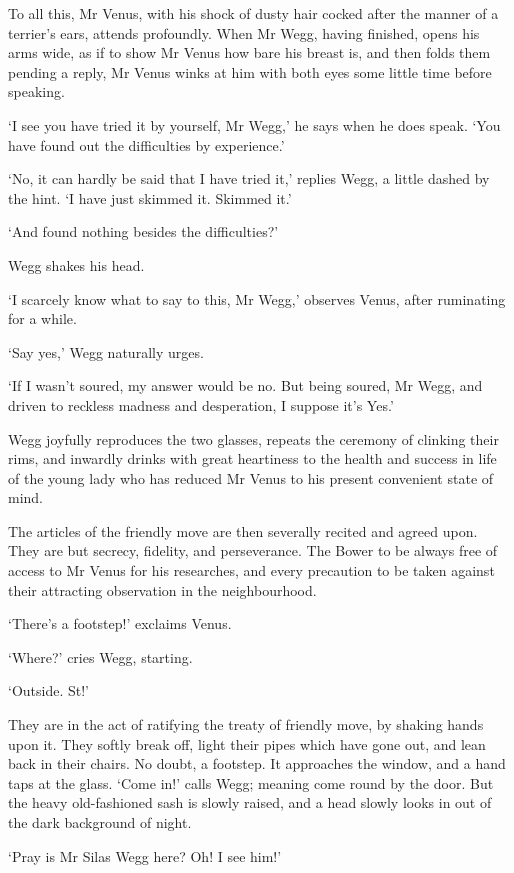 To all this, Mr Venus, with his shock of dusty hair cocked after the
manner of a terrier’s ears, attends profoundly. When Mr Wegg, having
finished, opens his arms wide, as if to show Mr Venus how bare his
breast is, and then folds them pending a reply, Mr Venus winks at him
with both eyes some little time before speaking.

‘I see you have tried it by yourself, Mr Wegg,’ he says when he does
speak. ‘You have found out the difficulties by experience.’

‘No, it can hardly be said that I have tried it,’ replies Wegg, a little
dashed by the hint. ‘I have just skimmed it. Skimmed it.’

‘And found nothing besides the difficulties?’

Wegg shakes his head.

‘I scarcely know what to say to this, Mr Wegg,’ observes Venus, after
ruminating for a while.

‘Say yes,’ Wegg naturally urges.

‘If I wasn’t soured, my answer would be no. But being soured, Mr Wegg,
and driven to reckless madness and desperation, I suppose it’s Yes.’

Wegg joyfully reproduces the two glasses, repeats the ceremony of
clinking their rims, and inwardly drinks with great heartiness to the
health and success in life of the young lady who has reduced Mr Venus to
his present convenient state of mind.

The articles of the friendly move are then severally recited and agreed
upon. They are but secrecy, fidelity, and perseverance. The Bower to
be always free of access to Mr Venus for his researches, and every
precaution to be taken against their attracting observation in the
neighbourhood.

‘There’s a footstep!’ exclaims Venus.

‘Where?’ cries Wegg, starting.

‘Outside. St!’

They are in the act of ratifying the treaty of friendly move, by shaking
hands upon it. They softly break off, light their pipes which have gone
out, and lean back in their chairs. No doubt, a footstep. It approaches
the window, and a hand taps at the glass. ‘Come in!’ calls Wegg; meaning
come round by the door. But the heavy old-fashioned sash is slowly
raised, and a head slowly looks in out of the dark background of night.

‘Pray is Mr Silas Wegg here? Oh! I see him!’

